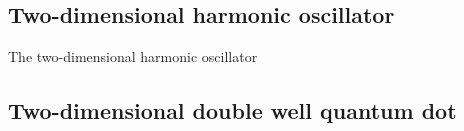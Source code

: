     \subsection{Two-dimensional harmonic oscillator}
        The two-dimensional harmonic oscillator

    \subsection{Two-dimensional double well quantum dot}
